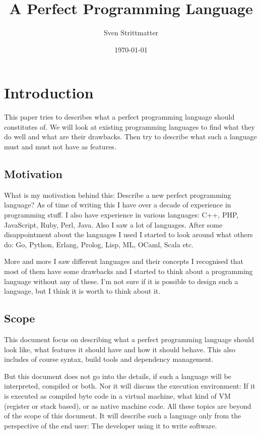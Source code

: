 \documentclass[11pt, a4paper]{report}
\title{A Perfect Programming Language}
\author{Sven Strittmatter}
\date{\today}
\begin{document}

\maketitle
\thispagestyle{empty}

\tableofcontents

\chapter{Introduction}


This paper tries to describes what a perfect programming language should constitutes of. We will look at existing programming languages to find what they do well and what are their drawbacks. Then try to describe what such a language must and must not have as features.

\section{Motivation}

What is my motivation behind this: Describe a new perfect programming language? As of time of writing this I have over a decade of experience in programming stuff. I also have experience in various languages: C++, PHP, JavaScript, Ruby, Perl, Java. Also I saw a lot of languages. After some disappointment about the languages I used I started to look around what others do: Go, Python, Erlang, Prolog, Lisp, ML, OCaml, Scala etc.

More and more I saw different languages and their concepts I recognised that most of them have some drawbacks and I started to think about a programming language without any of these. I'm not sure if it is possible to design such a language, but I think it is worth to think about it.

\section{Scope}

This document focus on describing what a perfect programming language should look like, what features it should have and how it should behave. This also includes of course syntax, build tools and dependency management.

But this document does not go into the details, if such a language will be interpreted, compiled or both. Nor it will discuss the execution environment: If it is executed as compiled byte code in a virtual machine, what kind of VM (register or stack based), or as native machine code. All these topics are beyond of the scope of this document. It will describe such a language only from the perspective of the end user: The developer using it to write software.
\end{document}
